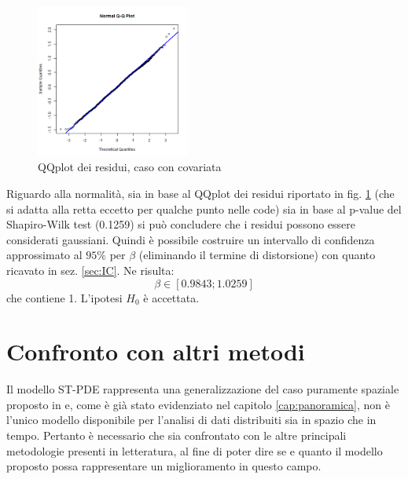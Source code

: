 \documentclass[a4paper,11pt,twoside,openright]{book}							%
\begin{document}
\begin{figure}[h]
	\centering
	\includegraphics[width=0.45\textwidth]{Immagini/DomCCovar/QQplot.png}   
   \caption{QQplot dei residui, caso con covariata}
	\label{fig:DomCcovar_qqplot}
\end{figure}
Riguardo alla normalità, sia in base al QQplot dei residui riportato in fig. \ref{fig:DomCcovar_qqplot} (che si adatta alla retta eccetto per qualche punto nelle code) sia in base al p-value del Shapiro-Wilk test (0.1259) si può concludere che i residui possono essere considerati gaussiani. Quindi è possibile costruire un intervallo di confidenza approssimato al $95\%$ per $\beta$ (eliminando il termine di distorsione) con quanto ricavato in sez. \ref{sec:IC}. Ne risulta:
$$
\beta \in [0.9843;1.0259]
$$
che contiene 1. L'ipotesi $H_0$ è accettata.



\chapter{Confronto con altri metodi}
\label{cap:confronto}

Il modello ST-PDE rappresenta una generalizzazione del caso puramente spaziale proposto in \cite{art:sangalli} e, come è già stato evidenziato nel capitolo \ref{cap:panoramica}, non è l'unico modello disponibile per l'analisi di dati distribuiti sia in spazio che in tempo. Pertanto è necessario che sia confrontato con le altre principali metodologie presenti in letteratura, al fine di poter dire se e quanto il modello proposto possa rappresentare un miglioramento in questo campo.
\end{document}
